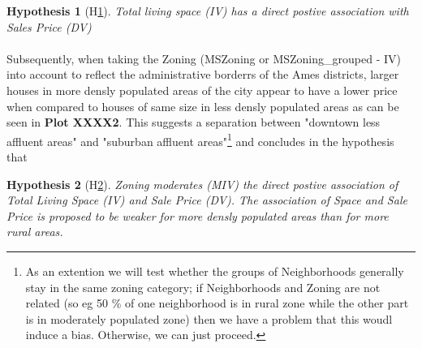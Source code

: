 \documentclass{article}
\newtheorem{hyp}{Hypothesis}
\begin{document}
\begin{hyp}[H\ref{hyp:first}] \label{hyp:first}
Total living space (IV) has a direct postive association with Sales Price (DV)
\end{hyp}

\begin{center}
\end{center}


\indent \paragraph{} Subsequently, when taking the Zoning (MSZoning or MSZoning\_grouped - IV) into account to reflect the administrative borderrs of the Ames districts, larger houses in more densly populated areas of the city appear to have a lower price when compared to houses of same size in less densly populated areas as can be seen in \textbf{Plot XXXX2}. This suggests a separation between "downtown less affluent areas" and "suburban affluent areas"\footnote{As an extention\: we will test whether the groups of Neighborhoods generally stay in the same zoning category; if Neighborhoods and Zoning are not related (so eg 50 \% of one neighborhood is in rural zone while the other part is in moderately populated zone) then we have a problem that this woudl induce a bias. Otherwise, we can just proceed.} and concludes in the hypothesis that

\begin{hyp}[H\ref{hyp:second}] \label{hyp:second}
Zoning moderates (MIV) the direct postive association of Total Living Space (IV) and Sale Price (DV). The association of Space and Sale Price is proposed to be weaker for more densly populated areas than for more rural areas. 
\end{hyp}

\begin{center}
\end{center}
\end{document}
